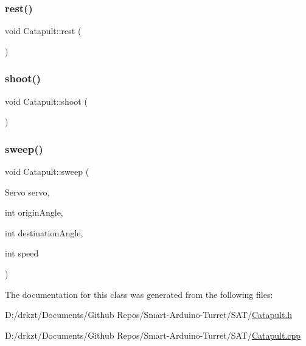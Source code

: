 \mbox{\label{class_catapult_ae9673fabd4375317bebb257b64db4d84}} 
\subsubsection{\texorpdfstring{rest()}{rest()}}
{\footnotesize\ttfamily void Catapult\+::rest (\begin{DoxyParamCaption}{ }\end{DoxyParamCaption})}

\mbox{\label{class_catapult_a4a2ea0d327a135f6a5a2283436e1a99f}} 
\subsubsection{\texorpdfstring{shoot()}{shoot()}}
{\footnotesize\ttfamily void Catapult\+::shoot (\begin{DoxyParamCaption}{ }\end{DoxyParamCaption})}

\mbox{\label{class_catapult_ae6274ce7039929a6c9468aa9d5d763ef}} 
\subsubsection{\texorpdfstring{sweep()}{sweep()}}
{\footnotesize\ttfamily void Catapult\+::sweep (\begin{DoxyParamCaption}\item[{Servo}]{servo,  }\item[{int}]{origin\+Angle,  }\item[{int}]{destination\+Angle,  }\item[{int}]{speed }\end{DoxyParamCaption})}



The documentation for this class was generated from the following files\+:\begin{DoxyCompactItemize}
\item 
D\+:/drkzt/\+Documents/\+Github Repos/\+Smart-\/\+Arduino-\/\+Turret/\+S\+A\+T/\hyperlink{_catapult_8h}{Catapult.\+h}\item 
D\+:/drkzt/\+Documents/\+Github Repos/\+Smart-\/\+Arduino-\/\+Turret/\+S\+A\+T/\hyperlink{_catapult_8cpp}{Catapult.\+cpp}\end{DoxyCompactItemize}
